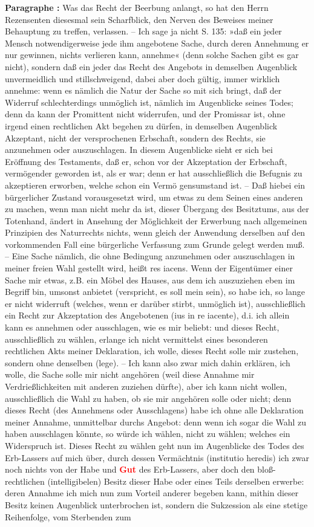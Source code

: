 \documentclass[a4paper,12pt,twoside]{book}
\newcommand{\match}[1]{\textcolor{red}{\textbf{#1}}}
\begin{document}
	\textbf{Paragraphe : }Was das Recht der Beerbung anlangt, so hat den Herrn Rezensenten diesesmal sein Scharfblick, den Nerven des Beweises meiner Behauptung zu treffen, verlassen. – Ich sage ja nicht S. 135: »daß ein jeder Mensch notwendigerweise jede ihm angebotene Sache, durch deren Annehmung er nur gewinnen, nichts verlieren kann, annehme« (denn solche Sachen gibt es gar nicht), sondern daß ein jeder das Recht des Angebots in demselben Augenblick unvermeidlich und stillschweigend, dabei aber doch gültig, immer wirklich annehme: wenn es nämlich die Natur der Sache so mit sich bringt, daß der Widerruf schlechterdings unmöglich ist, nämlich im Augenblicke seines Todes; denn da kann der Promittent nicht widerrufen, und der Promissar ist, ohne irgend einen rechtlichen Akt begehen zu dürfen, in demselben Augenblick Akzeptant, nicht der versprochenen Erbschaft, sondern des Rechts, sie anzunehmen oder auszuschlagen. In diesem Augenblicke sieht er sich bei Eröffnung des Testaments, daß er, schon vor der Akzeptation der Erbschaft, vermögender geworden ist, als er war; denn er hat ausschließlich die Befugnis zu akzeptieren erworben, welche schon ein Vermö gensumstand ist. – Daß hiebei ein bürgerlicher Zustand vorausgesetzt wird, um etwas zu dem Seinen eines anderen zu machen, wenn man nicht mehr da ist, dieser Übergang des Besitztums, aus der  Totenhand, ändert in Ansehung der Möglichkeit der Erwerbung nach allgemeinen Prinzipien des Naturrechts nichts, wenn gleich der Anwendung derselben auf den vorkommenden Fall eine bürgerliche Verfassung zum Grunde gelegt werden muß. – Eine Sache nämlich, die ohne Bedingung anzunehmen oder auszuschlagen in meiner freien Wahl gestellt wird, heißt res iacens. Wenn der Eigentümer einer Sache mir etwas, z.B. ein Möbel des Hauses, aus dem ich auszuziehen eben im Begriff bin, umsonst anbietet (verspricht, es soll mein sein), so habe ich, so lange er nicht widerruft (welches, wenn er darüber stirbt, unmöglich ist), ausschließlich ein Recht zur Akzeptation des Angebotenen (ius in re iacente), d.i. ich allein kann es annehmen oder ausschlagen, wie es mir beliebt: und dieses Recht, ausschließlich zu wählen, erlange ich nicht vermittelst eines besonderen rechtlichen Akts meiner Deklaration, ich wolle, dieses Recht solle mir zustehen, sondern ohne denselben (lege). – Ich kann also zwar mich dahin erklären, ich wolle, die Sache solle mir nicht angehören (weil diese Annahme mir Verdrießlichkeiten mit anderen zuziehen dürfte), aber ich kann nicht wollen, ausschließlich die Wahl zu haben, ob sie mir angehören solle oder nicht; denn dieses Recht (des Annehmens oder Ausschlagens) habe ich ohne alle Deklaration meiner Annahme, unmittelbar durchs Angebot: denn wenn ich sogar die Wahl zu haben ausschlagen könnte, so würde ich wählen, nicht zu wählen; welches ein Widerspruch ist. Dieses Recht zu wählen geht nun im Augenblicke des Todes des Erb-Lassers auf mich über, durch dessen Vermächtnis (institutio heredis) ich zwar noch nichts von der Habe und \match{Gut} des Erb-Lassers, aber doch den bloß-rechtlichen (intelligibelen) Besitz dieser Habe oder eines Teils derselben erwerbe: deren Annahme ich mich nun zum Vorteil anderer begeben kann, mithin dieser Besitz keinen Augenblick unterbrochen ist, sondern die Sukzession als eine stetige Reihenfolge, vom Sterbenden zum 
\end{document}
